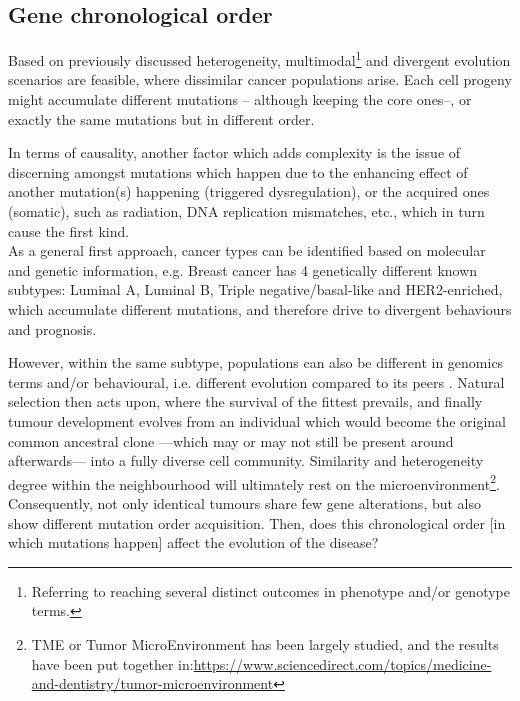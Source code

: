 \subsection{Gene chronological order}
Based on previously discussed heterogeneity, multimodal\footnote{Referring to reaching several distinct outcomes in phenotype and/or genotype terms.} and divergent evolution scenarios are feasible, where dissimilar cancer populations arise. Each cell progeny might accumulate different mutations -- although keeping the core ones--, or exactly the same mutations but in different order.

In terms of causality, another factor which adds complexity is the issue of discerning amongst mutations which happen due to the enhancing effect of another mutation(s) happening (triggered dysregulation), or the acquired ones (somatic), such as radiation, DNA replication mismatches, etc., which in turn cause the first kind.
\\

As a general first approach, cancer types can be identified based on molecular and genetic information, e.g. Breast cancer has 4 genetically different known subtypes: Luminal A, Luminal B, Triple negative/basal-like and HER2-enriched, which accumulate different mutations, and therefore drive to divergent behaviours and prognosis.

However, within the same subtype, populations can also be different in genomics terms and/or behavioural, i.e. different evolution compared to its peers \cite{Melo2013CancerView} \cite{Kent2017OrderEvolution}. Natural selection then acts upon, where the survival of the fittest prevails, and finally tumour development evolves from an individual which would become the original common ancestral clone —which may or may not still be present around afterwards— into a fully diverse cell community. Similarity and heterogeneity degree within the neighbourhood will ultimately rest on the microenvironment\footnote{TME or Tumor MicroEnvironment has been largely studied, and the results have been put together in:\url{https://www.sciencedirect.com/topics/medicine-and-dentistry/tumor-microenvironment}}.
\\

Consequently, not only identical tumours share few gene alterations, but also show different mutation order acquisition. Then, does this chronological order [in which mutations happen] affect the evolution of the disease?

